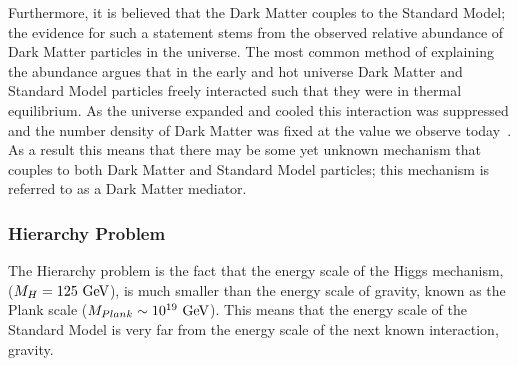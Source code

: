 Furthermore, it is believed that the Dark Matter couples to the Standard Model;
the evidence for such a statement stems from the observed relative abundance of Dark Matter particles in the universe.
The most common method of explaining the abundance
argues that in the early and hot universe Dark Matter and Standard Model particles
freely interacted such that they were in thermal equilibrium.
As the universe expanded and cooled this interaction was suppressed
and the number density of Dark Matter was fixed at the value we observe today~\cite{theo-bsm_dm_feng}.
As a result this means that there may be some yet unknown mechanism that couples to both Dark Matter and
Standard Model particles; this mechanism is referred to as a Dark Matter mediator.

\subsubsection{Hierarchy Problem}

The Hierarchy problem is the fact that the energy scale of the Higgs mechanism, ($M_{H}\nobreak=\nobreak125~\text{GeV}$),
is much smaller than the energy scale of gravity,
known as the Plank scale ($M_{Plank}\nobreak\sim\nobreak10^{19}~\text{GeV}$).
This means that the energy scale of the Standard Model is very far
from the energy scale of the next known interaction, gravity.

